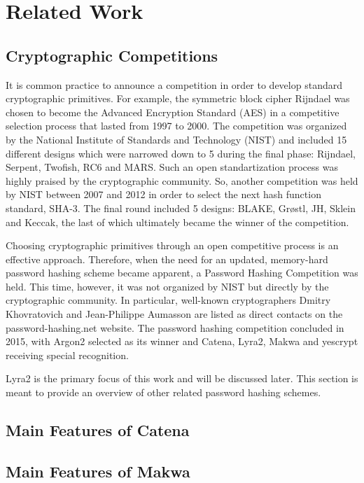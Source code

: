 \chapter{Related Work}
\label{chapter:related-work}

\section{Cryptographic Competitions}

It is common practice to announce a competition in order to develop standard cryptographic primitives. For example, the symmetric block cipher Rijndael \cite{daemen:2002:DRA} was chosen to become the Advanced Encryption Standard (AES) \cite{aes-fips} in a competitive selection process that lasted from 1997 to 2000. The competition was organized by the National Institute of Standards and Technology (NIST) and included 15 different designs which were narrowed down to 5 during the final phase: Rijndael, Serpent, Twofish, RC6 and MARS. Such an open standartization process was highly praised by the cryptographic community. So, another competition was held by NIST between 2007 and 2012 in order to select the next hash function standard, SHA-3. The final round included 5 designs: BLAKE, Grøstl, JH, Sklein and Keccak, the last of which ultimately became the winner of the competition.

Choosing cryptographic primitives through an open competitive process is an effective approach. Therefore, when the need for an updated, memory-hard password hashing scheme became apparent, a Password Hashing Competition was held. This time, however, it was not organized by NIST but directly by the cryptographic community. In particular, well-known cryptographers Dmitry Khovratovich and Jean-Philippe Aumasson are listed as direct contacts on the password-hashing.net website. The password hashing competition concluded in 2015, with Argon2 selected as its winner and Catena, Lyra2, Makwa and yescrypt receiving special recognition.

Lyra2 is the primary focus of this work and will be discussed later. This section is meant to provide an overview of other related password hashing schemes.

\section{Main Features of Catena}

\section{Main Features of Makwa}

